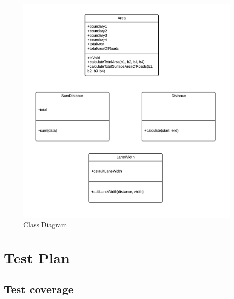 \documentclass[a4paper,11pt]{article}
\begin{document}
\begin{figure}[H]
  \includegraphics[width=\textwidth]{class-diagram}
  \caption{Class Diagram}\label{fig:class-diagram}
\end{figure}

\section{Test Plan}



\subsection{Test coverage}
\end{document}
